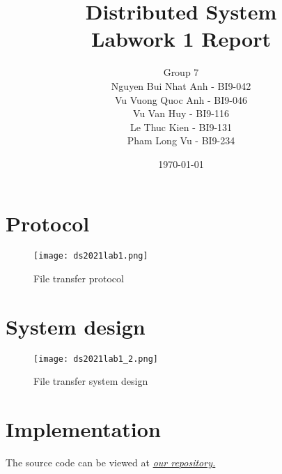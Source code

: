 \documentclass{article}
\title{Distributed System \\ Labwork 1 Report}
\author{Group 7 \\
Nguyen Bui Nhat Anh - BI9-042 \\
Vu Vuong Quoc Anh - BI9-046 \\
Vu Van Huy - BI9-116 \\
Le Thuc Kien - BI9-131 \\
Pham Long Vu - BI9-234}
\date{\today}
\begin{document}
\maketitle
\section{Protocol}
\begin{figure}[H]
    \centering
    \texttt{[image: ds2021lab1.png]}
    \caption{File transfer protocol}
    \label{fig:my_label}
\end{figure}

\section{System design}
\begin{figure}[H]
    \centering
    \texttt{[image: ds2021lab1\_2.png]}
    \caption{File transfer system design}
    \label{fig:my_label}
\end{figure}

\section{Implementation}
\par The source code can be viewed at \hyperlink{https://github.com/vvquocanh/ds2021}{\textit{our repository.}}
\end{document}
